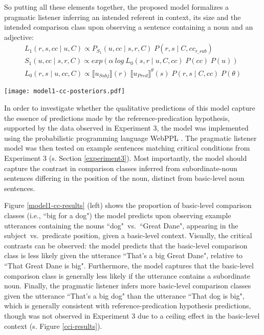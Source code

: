So putting all these elements together, the proposed model formalizes a pragmatic listener inferring an intended referent in context, its size and the intended comparison class upon observing a sentence containing a noun and an adjective:
\begin{gather*}
	L_1 (r, s, cc \mid u, C) \propto P_{S_1} (u, cc \mid s, r, C) \; P(r, s \mid C, cc_{r\_sub}) \\
	S_1 (u, cc \mid s, r, C)  \propto exp(\alpha \: log \: L_0 (s, r \mid u, C, cc) \; P(cc) \; P(u)) \\
	L_0 (r, s \mid u, cc, C) \propto \llbracket u_{Subj} \rrbracket (r)  \;  \llbracket u_{Pred} \rrbracket^{\theta} (s) \; P(r, s \mid C, cc) \; P(\theta)
\end{gather*}
 
\begin{figure*}[t]
 	\begin{center}
 		\texttt{[image: model1-cc-posteriors.pdf]}
 	\end{center}
 	\vspace{-0.3cm}
 	\caption{Qualitative predictions made by the refpred-RSA model: Pragmatic listener inferences are plotted in terms of the probability to use the basic-level comparison class (i.e., ``big for a dog"), given utterances differing in the noun and its position, presented in a basic-level context (left)~vs.~subordinate context (right). Qualitatively, the crucial noun$\times$syntax interaction can be observed. Note the different y-axis scaling.}
 	\label{model1-cc-results}
 \end{figure*}
In order to investigate whether the qualitative predictions of this model capture the essence of predictions made by the reference-predication hypothesis, supported by the data observed in Experiment 3, the model was implemented using the probabilistic programming language WebPPL \parencite{dippl}. The pragmatic listener model was then tested on example sentences matching critical conditions from Experiment 3 (s. Section \ref{experiment3}). Most importantly, the model should capture the contrast in comparison classes inferred from subordinate-noun sentences differing in the position of the noun, distinct from basic-level noun sentences.

Figure \ref{model1-cc-results} (left) shows the proportion of basic-level comparison classes (i.e., ``big for a dog") the model predicts upon observing example utterances containing the nouns ``dog"~vs.~``Great Dane", appearing in the subject~vs.~predicate position, given a basic-level context. 
Visually, the critical contrasts can be observed: the model predicts that the basic-level comparison class is less likely given the utterance ``That's a big Great Dane", relative to ``That Great Dane is big". Furthermore, the model captures that the basic-level comparison class is generally less likely if the utterance contains a subordinate noun. Finally, the pragmatic listener infers more basic-level comparison classes given the utterance ``That's a big dog" than the utterance ``That dog is big", which is generally consistent with reference-predication hypothesis predictions, though was not observed in Experiment 3 due to a ceiling effect in the basic-level context (s. Figure \ref{cci-results}). 

